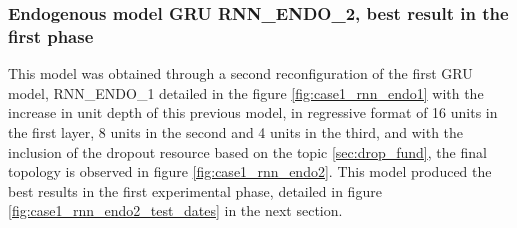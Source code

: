         \subsubsection{Endogenous model GRU RNN\_ENDO\_2, best result in the first phase}
           This model was obtained through a second reconfiguration of the first GRU model, RNN\_ENDO\_1 detailed in the figure \ref{fig:case1_rnn_endo1} with the increase in unit depth of this previous model, in regressive format of 16 units in the first layer, 8 units in the second and 4 units in the third, and with the inclusion of the dropout resource based on the topic  \ref{sec:drop_fund}, the final topology is observed in figure \ref{fig:case1_rnn_endo2}. This model produced the best results in the first experimental phase, detailed in figure \ref{fig:case1_rnn_endo2_test_dates} in the next section.
            \begin{figure}[H]
            \end{figure}
        
